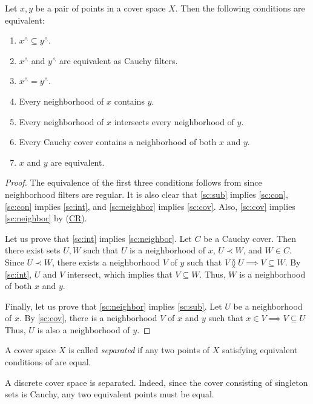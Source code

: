 \documentclass[reqno]{amsart}
\newcommand{\axref}[1]{(\hyperref[ax:#1]{#1})}
\theoremstyle{definition}
\theoremstyle{remark}
\numberwithin{figure}{section}
\newcommand{\overlap}[2]{#1 \between #2}
\newcommand{\rb}{\prec}
\begin{document}
\begin{lem}
Let $x,y$ be a pair of points in a cover space $X$.
Then the following conditions are equivalent:
\begin{enumerate}
\item \label{sc:sub} $x^\wedge \subseteq y^\wedge$.
\item $x^\wedge$ and $y^\wedge$ are equivalent as Cauchy filters.
\item $x^\wedge = y^\wedge$.
\item \label{sc:con} Every neighborhood of $x$ contains $y$.
\item \label{sc:int} Every neighborhood of $x$ intersects every neighborhood of $y$.
\item \label{sc:neighbor} Every Cauchy cover contains a neighborhood of both $x$ and $y$.
\item \label{sc:cov} $x$ and $y$ are equivalent.
\end{enumerate}
\end{lem}
\begin{proof}
The equivalence of the first three conditions follows from  since neighborhood filters are regular.
It is also clear that \eqref{sc:sub} implies \eqref{sc:con}, \eqref{sc:con} implies \eqref{sc:int}, and \eqref{sc:neighbor} implies \eqref{sc:cov}.
Also, \eqref{sc:cov} implies \eqref{sc:neighbor} by \axref{CR}.

Let us prove that \eqref{sc:int} implies \eqref{sc:neighbor}.
Let $C$ be a Cauchy cover.
Then there exist sets $U,W$ such that $U$ is a neighborhood of $x$, $U \rb W$, and $W \in C$.
Since $U \rb W$, there exists a neighborhood $V$ of $y$ such that $\overlap{V}{U} \implies V \subseteq W$.
By \eqref{sc:int}, $U$ and $V$ intersect, which implies that $V \subseteq W$.
Thus, $W$ is a neighborhood of both $x$ and $y$.

Finally, let us prove that \eqref{sc:neighbor} implies \eqref{sc:sub}.
Let $U$ be a neighborhood of $x$.
By \eqref{sc:cov}, there is a neighborhood $V$ of $x$ and $y$ such that $x \in V \implies V \subseteq U$
Thus, $U$ is also a neighborhood of $y$.
\end{proof}

\begin{defn}
A cover space $X$ is called \emph{separated} if any two points of $X$ satisfying equivalent conditions of  are equal.
\end{defn}

\begin{example}
A discrete cover space is separated.
Indeed, since the cover consisting of singleton sets is Cauchy, any two equivalent points must be equal.
\end{example}
\end{document}
